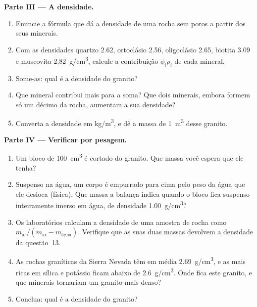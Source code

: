 \begin{problem}
\medskip
\noindent\textbf{Parte III --- A densidade.}
\begin{enumerate}[resume]
  \item Enuncie a fórmula que dá a densidade de uma rocha sem poros a partir
        dos seus minerais.
  \item Com as densidades quartzo \qty{2.62}{}, ortoclásio \qty{2.56}{},
        oligoclásio \qty{2.65}{}, biotita \qty{3.09}{} e muscovita
        \qty{2.82}{g/cm^3}, calcule a contribuição $\phi_i \rho_i$ de cada
        mineral.
  \item Some-as: qual é a densidade do granito?
  \item Que mineral contribui mais para a soma? Que dois minerais, embora
        formem só um décimo da rocha, aumentam a sua densidade?
  \item Converta a densidade em \unit{kg/m^3}, e dê a massa de
        \qty{1}{m^3} desse granito.
\end{enumerate}

\medskip
\noindent\textbf{Parte IV --- Verificar por pesagem.}
\begin{enumerate}[resume]
  \item Um bloco de \qty{100}{cm^3} é cortado do granito. Que massa você
        espera que ele tenha?
  \item Suspenso na água, um corpo é empurrado para cima pelo peso da água
        que ele desloca (física). Que massa a balança indica quando o bloco
        fica suspenso inteiramente imerso em água, de densidade
        \qty{1.00}{g/cm^3}?
  \item Os laboratórios calculam a densidade de uma amostra de rocha como
        $m_{\text{ar}}/(m_{\text{ar}} - m_{\text{água}})$. Verifique que
        as suas duas massas devolvem a densidade da questão~13.
  \item As rochas graníticas da Sierra Nevada têm em média
        \qty{2.69}{g/cm^3}, e as mais ricas em sílica e potássio ficam
        abaixo de \qty{2.6}{g/cm^3}. Onde fica este granito, e que minerais
        tornariam um granito mais denso?
  \item Conclua: qual é a densidade do granito?
\end{enumerate}
\end{problem}
